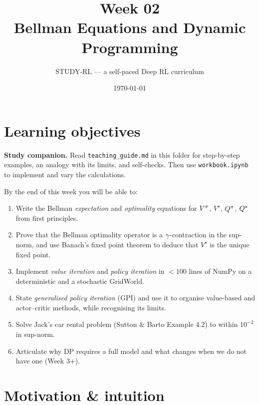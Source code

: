\documentclass[11pt,oneside]{scrbook}
\title{{\color{rlblue}\textbf{Week 02} \\ \Huge Bellman Equations and Dynamic Programming}}
\author{STUDY-RL --- a self-paced Deep RL curriculum}
\date{\today}
\begin{document}
\maketitle
\tableofcontents
\newpage

\chapter*{Learning objectives}

\noindent\textbf{Study companion.} Read \texttt{teaching\_guide.md} in this
folder for step-by-step examples, an analogy with its limits, and self-checks.
Then use \texttt{workbook.ipynb} to implement and vary the calculations.
\par\medskip

\begin{keyidea}
By the end of this week you will be able to:
\begin{enumerate}\setlength\itemsep{2pt}
  \item Write the Bellman \emph{expectation} and \emph{optimality} equations
        for $V^\pi$, $V^\star$, $Q^\pi$, $Q^\star$ from first
        principles.
  \item Prove that the Bellman optimality operator is a $\gamma$-contraction in
        the sup-norm, and use Banach's fixed point theorem to deduce that $V^\star$
        is the unique fixed point.
  \item Implement \emph{value iteration} and \emph{policy iteration} in
        $<\!100$ lines of NumPy on a deterministic and a stochastic GridWorld.
  \item State \emph{generalised policy iteration} (GPI) and use it to organise
        value-based and actor--critic methods, while recognising its limits.
  \item Solve Jack's car rental problem (Sutton \& Barto Example 4.2) to
        within $10^{-2}$ in sup-norm.
  \item Articulate why DP requires a full model and what changes when we do
        not have one (Week 3+).
\end{enumerate}
\end{keyidea}

\chapter{Motivation \& intuition}
\label{ch:motivation}
\end{document}
